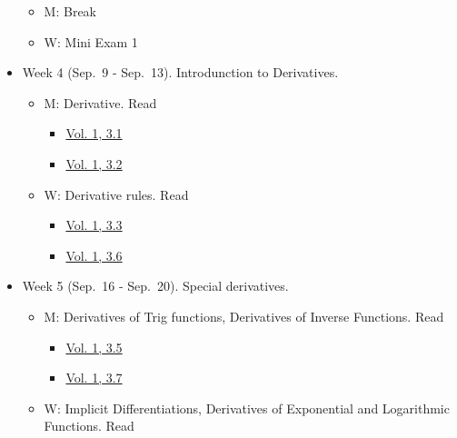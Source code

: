 \documentclass[
]{article}
\providecommand{\tightlist}{%
  \setlength{\itemsep}{0pt}\setlength{\parskip}{0pt}}
\begin{document}
\begin{itemize}
  \begin{itemize}
  \tightlist
  \item
    M: Break
  \item
    W: Mini Exam 1
  \end{itemize}
\item
  Week 4 (Sep.~9 - Sep.~13). Introdunction to Derivatives.

  \begin{itemize}
  \tightlist
  \item
    M: Derivative. Read

    \begin{itemize}
    \tightlist
    \item
      \href{https://openstax.org/books/calculus-volume-1/pages/3-1-defining-the-derivative}{Vol. 1, 3.1}
    \item
      \href{https://openstax.org/books/calculus-volume-1/pages/3-2-the-derivative-as-a-function}{Vol. 1, 3.2}
    \end{itemize}
  \item
    W: Derivative rules. Read

    \begin{itemize}
    \tightlist
    \item
      \href{https://openstax.org/books/calculus-volume-1/pages/3-3-differentiation-rules}{Vol. 1, 3.3}
    \item
      \href{https://openstax.org/books/calculus-volume-1/pages/3-6-the-chain-rule}{Vol. 1, 3.6}
    \end{itemize}
  \end{itemize}
\item
  Week 5 (Sep.~16 - Sep.~20). Special derivatives.

  \begin{itemize}
  \tightlist
  \item
    M: Derivatives of Trig functions, Derivatives of Inverse Functions. Read

    \begin{itemize}
    \tightlist
    \item
      \href{https://openstax.org/books/calculus-volume-1/pages/3-5-derivatives-of-trigonometric-functions}{Vol. 1, 3.5}
    \item
      \href{https://openstax.org/books/calculus-volume-1/pages/3-7-derivatives-of-inverse-functions}{Vol. 1, 3.7}
    \end{itemize}
  \item
    W: Implicit Differentiations, Derivatives of Exponential and Logarithmic Functions. Read


\end{itemize}
\end{itemize}
\end{document}
